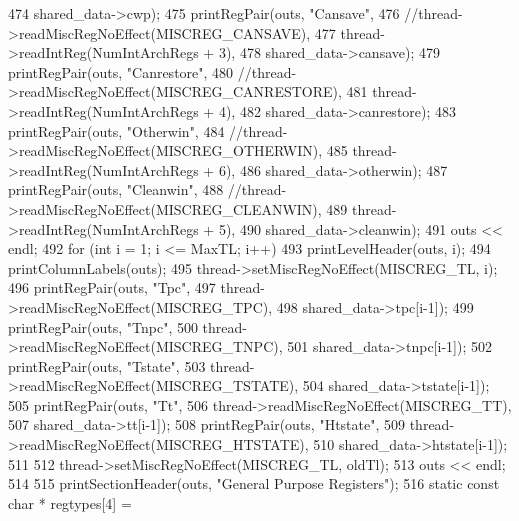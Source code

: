 \begin{DoxyCode}
{{{{{474                             shared_data->cwp);
475                     printRegPair(outs, "Cansave",
476                             //thread->readMiscRegNoEffect(MISCREG_CANSAVE),
477                             thread->readIntReg(NumIntArchRegs + 3),
478                             shared_data->cansave);
479                     printRegPair(outs, "Canrestore",
480                             //thread->readMiscRegNoEffect(MISCREG_CANRESTORE),
481                             thread->readIntReg(NumIntArchRegs + 4),
482                             shared_data->canrestore);
483                     printRegPair(outs, "Otherwin",
484                             //thread->readMiscRegNoEffect(MISCREG_OTHERWIN),
485                             thread->readIntReg(NumIntArchRegs + 6),
486                             shared_data->otherwin);
487                     printRegPair(outs, "Cleanwin",
488                             //thread->readMiscRegNoEffect(MISCREG_CLEANWIN),
489                             thread->readIntReg(NumIntArchRegs + 5),
490                             shared_data->cleanwin);
491                     outs << endl;
492                     for (int i = 1; i <= MaxTL; i++) {
493                         printLevelHeader(outs, i);
494                         printColumnLabels(outs);
495                         thread->setMiscRegNoEffect(MISCREG_TL, i);
496                         printRegPair(outs, "Tpc",
497                                 thread->readMiscRegNoEffect(MISCREG_TPC),
498                                 shared_data->tpc[i-1]);
499                         printRegPair(outs, "Tnpc",
500                                 thread->readMiscRegNoEffect(MISCREG_TNPC),
501                                 shared_data->tnpc[i-1]);
502                         printRegPair(outs, "Tstate",
503                                 thread->readMiscRegNoEffect(MISCREG_TSTATE),
504                                 shared_data->tstate[i-1]);
505                         printRegPair(outs, "Tt",
506                                 thread->readMiscRegNoEffect(MISCREG_TT),
507                                 shared_data->tt[i-1]);
508                         printRegPair(outs, "Htstate",
509                                 thread->readMiscRegNoEffect(MISCREG_HTSTATE),
510                                 shared_data->htstate[i-1]);
511                     }
512                     thread->setMiscRegNoEffect(MISCREG_TL, oldTl);
513                     outs << endl;
514 
515                     printSectionHeader(outs, "General Purpose Registers");
516                     static const char * regtypes[4] =
}}}}}
\end{DoxyCode}
